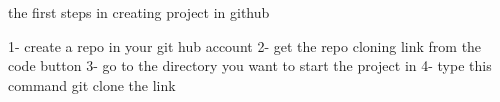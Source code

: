 the first steps in creating project in github 

1- create a repo in your git hub account 
2- get the repo cloning link from the code button 
3- go to the directory you want to start the project in 
4- type this command 
  git clone   the link